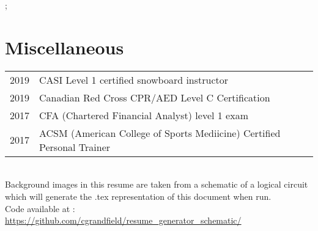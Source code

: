 \documentclass[a4paper,10pt]{article}
\begin{document}
\newpage
{};

\hspace{-0.75cm}
\makebox[0pt][s]{%
  \raisebox{-\totalheight}[0pt][0pt]{%
``  \begin{tikzpicture}
	\draw[draw=white,fill=white, opacity=0.9] (0,0) rectangle ++(\paperwidth-2cm,6cm);
    \end{tikzpicture}
  }
}%

\section{Miscellaneous}




\begin{tabular}{rl}
2019 & CASI Level 1 certified snowboard instructor \\
2019 & Canadian Red Cross CPR/AED Level C Certification \\
2017 & CFA (Chartered Financial Analyst) level 1 exam \\
2017 & ACSM (American College of Sports Mediicine) Certified Personal Trainer \\
\end{tabular} \\

Background images in this resume are taken from a schematic of a logical circuit which will generate the .tex representation of this document when run. \\ 
Code available at :   \href{https://github.com/cgrandfield/resume_generator_schematic/}{https://github.com/cgrandfield/resume\_generator\_schematic/} \\  
\end{document}
